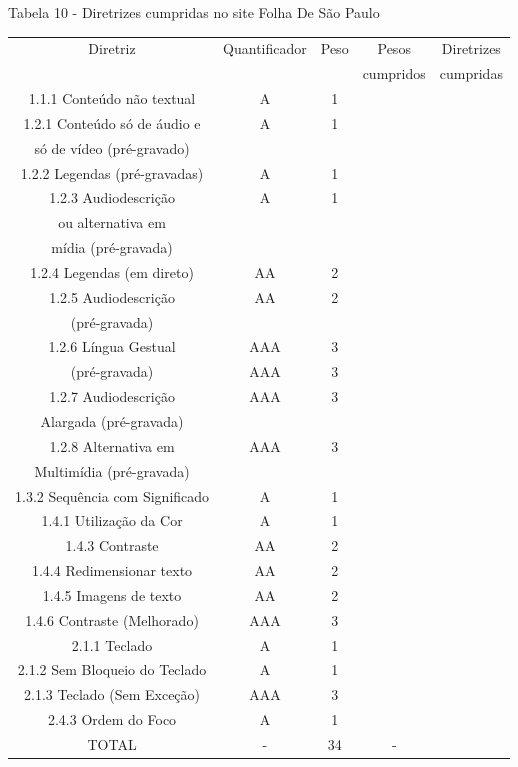 \documentclass[a4paper]{article}
\begin{document}
\begin{titlepage}
Tabela 10 - Diretrizes cumpridas no site Folha De São Paulo\\[-1cm]
\begin{center}
	\fontsize{8pt}{8pt}\selectfont	
	\begin{longtable}{|c|c|c|c|c|}
		\hline
		Diretriz & Quantificador & Peso & Pesos & Diretrizes\\
		& & & cumpridos & cumpridas\\
		\hline
		1.1.1 Conteúdo não textual & A & 1 & & \\
		\hline
		1.2.1 Conteúdo só de áudio e & A & 1 & & \\
		só de vídeo (pré-gravado) & & & & \\
		\hline
		1.2.2 Legendas (pré-gravadas) & A & 1 & & \\
		\hline
		1.2.3 Audiodescrição & A & 1 & & \\
		ou alternativa em & & & & \\
		mídia (pré-gravada) & & & & \\
		\hline
		1.2.4 Legendas (em direto) & AA & 2 & & \\
		\hline
		1.2.5 Audiodescrição & AA & 2 & & \\
		(pré-gravada) & & & & \\
		\hline
		1.2.6 Língua Gestual & AAA & 3 & & \\
		(pré-gravada) & AAA & 3 & & \\
		\hline
		1.2.7 Audiodescrição & AAA & 3 & & \\
		Alargada (pré-gravada) & & & & \\
		\hline
		1.2.8 Alternativa em & AAA & 3 & & \\
		Multimídia (pré-gravada) & & & & \\
		\hline
		1.3.2 Sequência com Significado & A & 1 & & \\
		\hline
		1.4.1 Utilização da Cor & A & 1 & & \\
		\hline
		1.4.3 Contraste & AA & 2 & & \\
		\hline
		1.4.4 Redimensionar texto & AA & 2 & & \\
		\hline
		1.4.5 Imagens de texto & AA & 2 & & \\
		\hline
		1.4.6 Contraste (Melhorado) & AAA & 3 & & \\
		\hline
		2.1.1 Teclado & A & 1 & & \\
		\hline
		2.1.2 Sem Bloqueio do Teclado & A & 1 & & \\
		\hline
		2.1.3 Teclado (Sem Exceção) & AAA & 3 & & \\
		\hline
		2.4.3 Ordem do Foco & A & 1 & & \\
		\hline
		TOTAL & - & 34 & - & \\
		\hline
	\end{longtable}
\end{center}


\end{titlepage}
\end{document}

